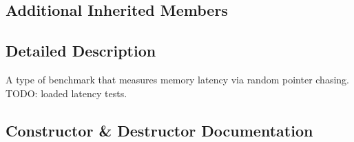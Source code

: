 \subsection*{Additional Inherited Members}


\subsection{Detailed Description}
A type of benchmark that measures memory latency via random pointer chasing. T\+O\+D\+O\+: loaded latency tests. 

\subsection{Constructor \& Destructor Documentation}
\hypertarget{classxmem_1_1benchmark_1_1_latency_benchmark_a485434e0f506427b28073a2a3e287e21}{}
